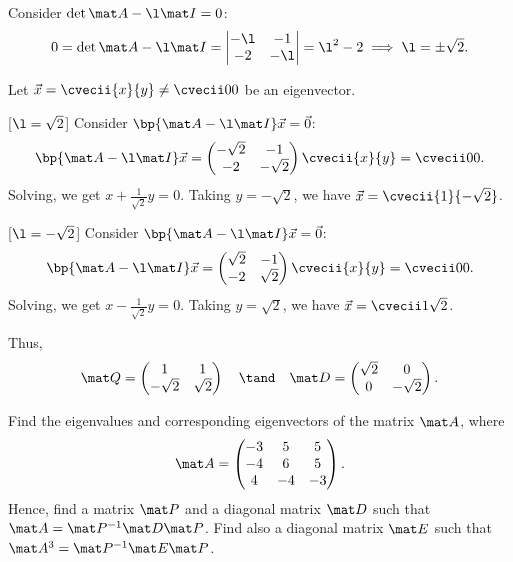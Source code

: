 \begin{solution}
    \begin{ppart}
        Consider $\det{\mat A - \l \mat I} = 0$: \[0 = \det{\mat A - \l \mat I} = \begin{vmatrix}-\l & -1 \\ -2 & -\l\end{vmatrix} = \l^2 - 2 \implies \l = \pm \sqrt2.\]

        Let $\vec x = \cvecii{x}{y} \neq \cvecii00$ be an eigenvector.

        [$\l = \sqrt2$] Consider $\bp{\mat A - \l \mat I} \vec x = \vec 0$: \[\bp{\mat A - \l \mat I} \vec x = \begin{pmatrix}-\sqrt2 & -1 \\ -2 & -\sqrt2\end{pmatrix} \cvecii{x}{y} = \cvecii00.\] Solving, we get $x + \frac1{\sqrt2} y = 0$. Taking $y = -\sqrt2$, we have $\vec x = \cvecii{1}{-\sqrt2}$.

        [$\l = -\sqrt2$] Consider $\bp{\mat A - \l \mat I} \vec x = \vec 0$: \[\bp{\mat A - \l \mat I} \vec x = \begin{pmatrix}\sqrt2 & -1 \\ -2 & \sqrt2\end{pmatrix} \cvecii{x}{y} = \cvecii00.\] Solving, we get $x - \frac1{\sqrt2} y = 0$. Taking $y = \sqrt2$, we have $\vec x = \cvecii1{\sqrt2}$.

        Thus, \[\mat Q = \begin{pmatrix}1 & 1 \\ -\sqrt2 & \sqrt2 \end{pmatrix} \quad \tand \quad \mat D = \begin{pmatrix}\sqrt2 & 0 \\ 0 & -\sqrt2 \end{pmatrix}.\]
    \end{ppart}
\end{solution}

\begin{problem}
    Find the eigenvalues and corresponding eigenvectors of the matrix $\mat A$, where \[\mat A = \begin{pmatrix}-3 & 5 & 5 \\ -4 & 6 & 5 \\ 4 & -4 & -3\end{pmatrix}.\] Hence, find a matrix $\mat P$ and a diagonal matrix $\mat D$ such that $\mat A = \mat P^{-1} \mat D \mat P$. Find also a diagonal matrix $\mat E$ such that $\mat A^3 = \mat P^{-1} \mat E \mat P$.
\end{problem}

